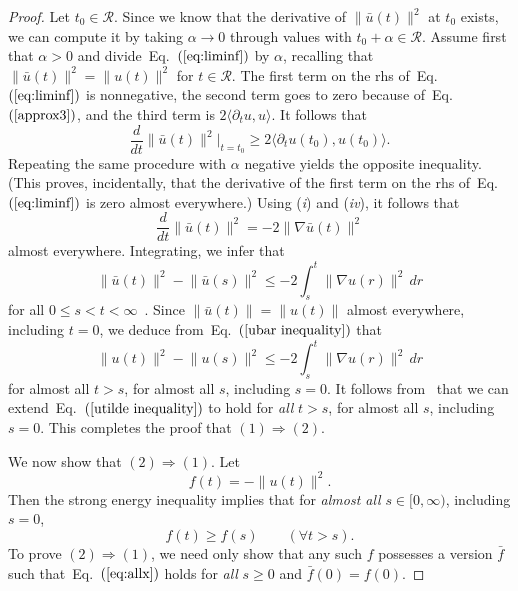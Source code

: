 \documentclass{article}
\def\eq#1{Eq.~$(\ref{#1})$}
\def\Rcal{{\mathcal{R}}}
\begin{document}
\begin{proof}
Let $t_0\in \Rcal$.  Since we know that the derivative of
$\lVert\bar u(t)\rVert^2$ at $t_0$ exists, we can compute it by taking
$\alpha\to 0$ through values with $t_0 +\alpha\in\Rcal$. Assume first
that $\alpha > 0$ and divide~\eq{eq:liminf} by $\alpha$, recalling
that $\lVert \bar u(t) \rVert^2= \lVert u(t) \rVert^2$ for $t\in\Rcal$.  The first
term on the rhs of~\eq{eq:liminf} is nonnegative, the second term goes
to zero because of~\eq{approx3}, and the third term is
$2\langle \partial_t u, u\rangle$. It follows that
\begin{equation*}
  \frac{d}{dt} \lVert \bar u(t)\rVert^2 \biggr \rvert_{t=t_0} \ge 2\langle \partial_tu(t_0),  u(t_0)\rangle.
\end{equation*}
Repeating the same procedure with $\alpha$ negative yields the
opposite inequality. (This proves, incidentally, that the derivative
of the first term on the rhs of~\eq{eq:liminf} is zero almost
everywhere.)  Using (\textit{i}) and (\textit{iv}), it follows that
\begin{equation*}
    \frac{d}{dt} \lVert \bar u(t)\rVert^2  =  - 2\lVert \nabla \bar u(t)\rVert^2
\end{equation*}
almost everywhere. Integrating, we infer that
\begin{equation}
\label{ubar inequality}
  \lVert \bar u(t) \rVert^2 - \lVert \bar u(s)\rVert^2 \le  - 2 \int_s^t \lVert \nabla u(r)\rVert^2\,dr
\end{equation}
for all $0\le s < t < \infty$~\cite[Theorem~5.2]{royden.1968}. Since
$\lVert \bar u(t) \rVert  = \lVert  u(t) \rVert$ almost everywhere, including $t=0$, we deduce from~\eq{ubar inequality} that
\begin{equation}
\label{utilde inequality}
  \lVert  u(t) \rVert^2 - \lVert  u(s)\rVert^2 \le  - 2 \int_s^t \lVert \nabla u(r)\rVert^2\,dr
\end{equation}
for almost all $t>s$, for almost all $s$, including $s=0$. It follows
from~\cite[p.99-100]{RobRodSad16} that we can extend~\eq{utilde
  inequality} to hold for \textit{all} $t>s$, for almost all $s$,
including $s=0$.  This completes the proof that $(1)\Rightarrow(2)$.

We now show that $(2)\Rightarrow(1)$. Let
\begin{displaymath}
  f(t) =  -\lVert u(t)\rVert^2.
\end{displaymath}
Then the strong energy inequality implies that
for \textit{almost all} $s \in [0,\infty)$, including $s = 0$,
\begin{equation}
  \label{eq:allx}
  f(t) \ge f(s)  \qquad (\forall t > s).
\end{equation}
To prove $(2)\Rightarrow(1)$, we need only show that any such $f$ possesses a
version $\bar f$ such that~\eq{eq:allx} holds for \textit{all}
$s\ge0$ and $\bar f(0)=f(0)$.


\end{proof}
\end{document}
